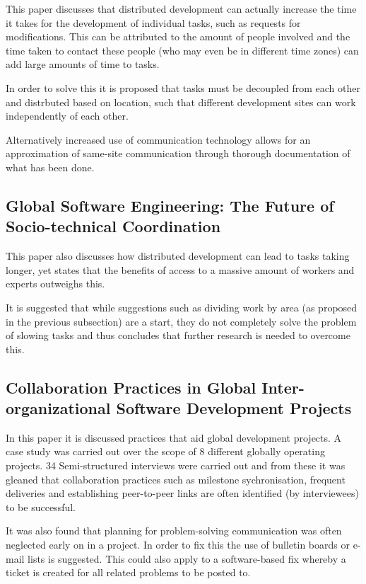 \documentclass{l4proj}
\begin{document}
This paper discusses that distributed development can actually increase the time it takes for the development of individual tasks, such as requests for modifications.  This can be attributed to the amount of people involved and the time taken to contact these people (who may even be in different time zones) can add large amounts of time to tasks.  

In order to solve this it is proposed that tasks must be decoupled from each other and distrbuted based on location, such that different development sites can work independently of each other.

Alternatively increased use of communication technology allows for an approximation of same-site communication through thorough documentation of what has been done.

\subsection {Global Software Engineering: The Future of Socio-technical Coordination}

This paper also discusses how distributed development can lead to tasks taking longer, yet states that the benefits of access to a massive amount of workers and experts outweighs this.

It is suggested that while suggestions such as dividing work by area (as proposed in the previous subsection) are a start, they do not completely solve the problem of slowing tasks and thus concludes that further research is needed to overcome this.



\subsection {Collaboration Practices in Global Inter-organizational Software Development Projects}

In this paper it is discussed practices that aid global development projects.  A case study was carried out over the scope of 8 different globally operating projects.  34 Semi-structured interviews were carried out and from these it was gleaned that collaboration practices such as milestone sychronisation, frequent deliveries and establishing peer-to-peer links are often identified (by interviewees) to be successful. 

It was also found that planning for problem-solving communication was often neglected early on in a project.  In order to fix this the use of bulletin boards or e-mail lists is suggested.  This could also apply to a software-based fix whereby a ticket is created for all related problems to be posted to.
\end{document}
